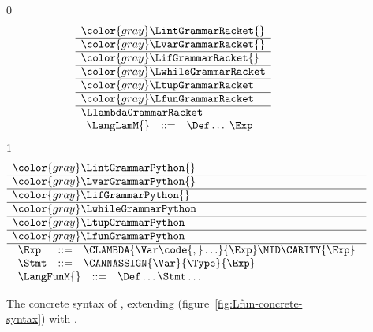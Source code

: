 \documentclass[7x10]{TimesAPriori_MIT}%
\newcommand{\gray}[1]{{\color{gray} #1}}
\def\racketEd{0}
\def\pythonEd{1}
\def\edition{1}
\newcommand{\pythonColor}[0]{}
\numberwithin{theorem}{chapter}
\numberwithin{definition}{chapter}
\numberwithin{equation}{chapter}
\begin{document}
\newcommand{\LlambdaGrammarPython}{
  \begin{array}{lcl}
  \Exp &::=& \CLAMBDA{\Var\code{, }\ldots}{\Exp} \MID \CARITY{\Exp} \\
  \Stmt &::=& \CANNASSIGN{\Var}{\Type}{\Exp}
  \end{array}
}

\newcommand{\LlambdaASTPython}{
  \begin{array}{lcl}
  \Exp &::=& \LAMBDA{\Var^{*}}{\Exp} \MID \ARITY{\Exp} \\
  \Stmt &::=& \ANNASSIGN{\Var}{\Type}{\Exp}
  \end{array}
}



\begin{figure}[tp]
\centering
\begin{tcolorbox}[colback=white]
    \small
{\if\edition\racketEd
\[
\begin{array}{l}
  \gray{\LintGrammarRacket{}} \\ \hline
  \gray{\LvarGrammarRacket{}} \\ \hline
  \gray{\LifGrammarRacket{}} \\ \hline
  \gray{\LwhileGrammarRacket} \\ \hline
  \gray{\LtupGrammarRacket} \\   \hline
  \gray{\LfunGrammarRacket} \\   \hline
  \LlambdaGrammarRacket \\
  \begin{array}{lcl}
  \LangLamM{} &::=& \Def\ldots \; \Exp
  \end{array}
\end{array}
\]
\fi}
{\if\edition\pythonEd\pythonColor
\[
\begin{array}{l}
  \gray{\LintGrammarPython{}} \\ \hline
  \gray{\LvarGrammarPython{}} \\ \hline
  \gray{\LifGrammarPython{}} \\ \hline
  \gray{\LwhileGrammarPython} \\ \hline
  \gray{\LtupGrammarPython} \\   \hline
  \gray{\LfunGrammarPython} \\   \hline
  \LlambdaGrammarPython \\
  \begin{array}{lcl}
    \LangFunM{} &::=& \Def\ldots \Stmt\ldots
  \end{array}
\end{array}
\]
\fi}
\end{tcolorbox}
\caption{The concrete syntax of \LangLam{}, extending \LangFun{} (figure~\ref{fig:Lfun-concrete-syntax}) 
  with .}
\label{fig:Llam-concrete-syntax}
\end{figure}
\end{document}
